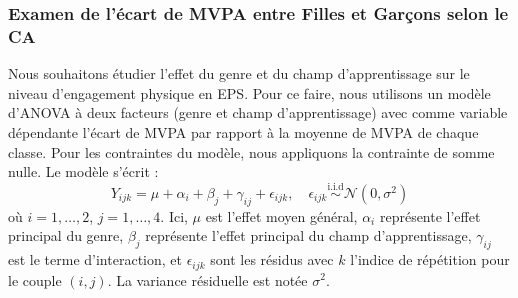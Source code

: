 \documentclass[12pt,a4paper]{article}
\begin{document}
\subsubsection{Examen de l'écart de MVPA entre Filles et Garçons selon le CA}
	Nous souhaitons étudier l'effet du genre et du champ d'apprentissage sur le niveau d'engagement physique en EPS. Pour ce faire, nous utilisons un modèle d'ANOVA à deux facteurs (genre et champ d'apprentissage) avec comme variable dépendante l'écart de MVPA par rapport à la moyenne de MVPA de chaque classe. Pour les contraintes du modèle, nous appliquons la contrainte de somme nulle. Le modèle s'écrit :
	\begin{equation}
		Y_{ijk} = \mu + \alpha_i + \beta_j + \gamma_{ij} + \epsilon_{ijk}, \quad \epsilon_{ijk} \overset{\text{i.i.d}}{\sim} \mathcal{N}(0, \sigma^2) \tag{M1}
	\end{equation}
	\noindent
	où $i = 1, \ldots, 2$, $j = 1, \ldots, 4$. Ici, $\mu$ est l'effet moyen général, $\alpha_i$ représente l'effet principal du genre, $\beta_j$ représente l'effet principal du champ d'apprentissage, $\gamma_{ij}$ est le terme d'interaction, et $\epsilon_{ijk}$ sont les résidus avec $k$ l'indice de répétition pour le couple $(i, j)$. La variance résiduelle est notée $\sigma^2$.\\
\end{document}
